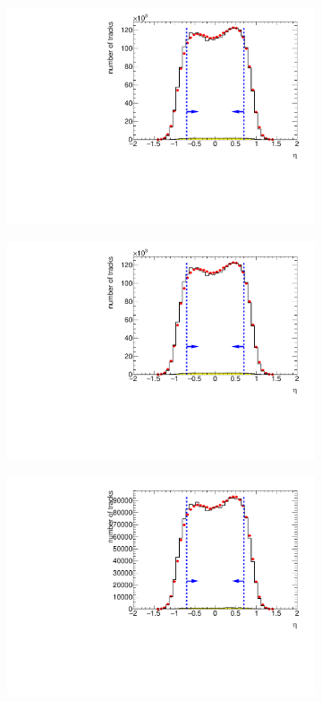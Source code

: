 \begin{figure}[h!]
	\centering
	\begin{subfigure}{.45\textwidth}
		\includegraphics[width=\textwidth, page=2]{chapters/chrgSTAR/img/selection/SDT.pdf}
		\caption{}
	\end{subfigure}
	\begin{subfigure}{.45\textwidth}
		\includegraphics[width=\textwidth, page=3]{chapters/chrgSTAR/img/selection/SDT.pdf}
		\caption{}
	\end{subfigure}
	\begin{subfigure}{.45\textwidth}
		\includegraphics[width=\textwidth, page=12]{chapters/chrgSTAR/img/selection/SDT_0.pdf}

\end{subfigure}
\end{figure}
